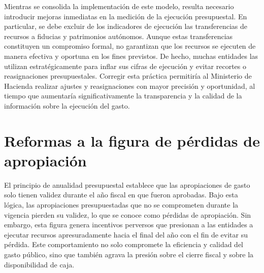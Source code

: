Mientras se consolida la implementación de este modelo, resulta necesario introducir mejoras inmediatas en la medición de la ejecución presupuestal. En particular, se debe excluir de los indicadores de ejecución las transferencias de recursos a fiducias y patrimonios autónomos. Aunque estas transferencias constituyen un compromiso formal, no garantizan que los recursos se ejecuten de manera efectiva y oportuna en los fines previstos. De hecho, muchas entidades las utilizan estratégicamente para inflar sus cifras de ejecución y evitar recortes o reasignaciones presupuestales. Corregir esta práctica permitiría al Ministerio de Hacienda realizar ajustes y reasignaciones con mayor precisión y oportunidad, al tiempo que aumentaría significativamente la transparencia y la calidad de la información sobre la ejecución del gasto.



\section{Reformas a la figura de pérdidas de apropiación}

El principio de anualidad presupuestal establece que las apropiaciones de gasto solo tienen validez durante el año fiscal en que fueron aprobadas. Bajo esta lógica, las apropiaciones presupuestadas que no se comprometen durante la vigencia pierden su validez, lo que se conoce como pérdidas de apropiación. Sin embargo, esta figura genera incentivos perversos que presionan a las entidades a ejecutar recursos apresuradamente hacia el final del año con el fin de evitar su pérdida. Este comportamiento no solo compromete la eficiencia y calidad del gasto público, sino que también agrava la presión sobre el cierre fiscal y sobre la disponibilidad de caja.

